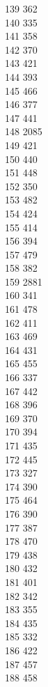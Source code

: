 { 139	362 \\
 140	335 \\
 141	358 \\
 142	370 \\
 143	421 \\
 144	393 \\
 145	466 \\
 146	377 \\
 147	441 \\
 148	2085 \\
 149	421 \\
 150	440 \\
 151	448 \\
 152	350 \\
 153	482 \\
 154	424 \\
 155	414 \\
 156	394 \\
 157	479 \\
 158	382 \\
 159	2881 \\
 160	341 \\
 161	478 \\
 162	411 \\
 163	469 \\
 164	431 \\
 165	455 \\
 166	337 \\
 167	442 \\
 168	396 \\
 169	370 \\
 170	394 \\
 171	435 \\
 172	445 \\
 173	327 \\
 174	390 \\
 175	464 \\
 176	390 \\
 177	387 \\
 178	470 \\
 179	438 \\
 180	432 \\
 181	401 \\
 182	342 \\
 183	355 \\
 184	435 \\
 185	332 \\
 186	422 \\
 187	457 \\
 188	458 \\
}
